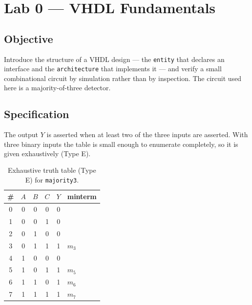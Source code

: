 %
%

\chapter{Lab 0 --- VHDL Fundamentals}

\section{Objective}

Introduce the structure of a VHDL design --- the \texttt{entity} that declares an
interface and the \texttt{architecture} that implements it --- and verify a small
combinational circuit by simulation rather than by inspection. The circuit used
here is a majority-of-three detector.

\section{Specification}

The output $Y$ is asserted when at least two of the three inputs are asserted.
With three binary inputs the table is small enough to enumerate completely, so it
is given exhaustively (Type E).

\begin{table}[htbp]
\centering
\caption{Exhaustive truth table (Type E) for \texttt{majority3}.}
\label{tab:lab00-truth}
\begin{tabular}{cccc||cl}
\toprule
\# & $A$ & $B$ & $C$ & $Y$ & minterm \\
\midrule
0 & 0 & 0 & 0 & 0 & \\
1 & 0 & 0 & 1 & 0 & \\
2 & 0 & 1 & 0 & 0 & \\
3 & 0 & 1 & 1 & 1 & $m_3$ \\
4 & 1 & 0 & 0 & 0 & \\
5 & 1 & 0 & 1 & 1 & $m_5$ \\
6 & 1 & 1 & 0 & 1 & $m_6$ \\
7 & 1 & 1 & 1 & 1 & $m_7$ \\
\bottomrule
\end{tabular}
\end{table}

